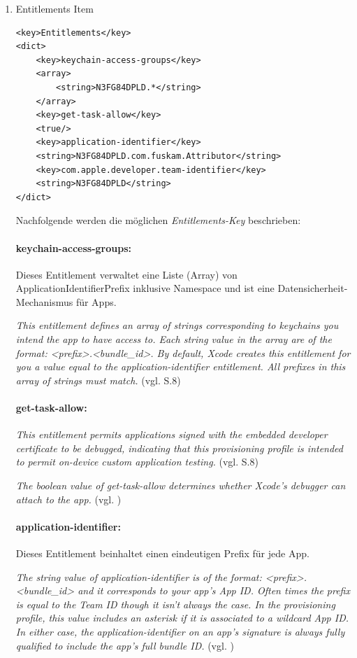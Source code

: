 \begin{enumerate}
    \item Entitlements Item
\begin{lstlisting}[captionpos=b, caption={Entitlements Item}]
<key>Entitlements</key>
<dict>
    <key>keychain-access-groups</key>
    <array>
        <string>N3FG84DPLD.*</string>           
    </array>
    <key>get-task-allow</key>
    <true/>
    <key>application-identifier</key>
    <string>N3FG84DPLD.com.fuskam.Attributor</string>
    <key>com.apple.developer.team-identifier</key>
    <string>N3FG84DPLD</string>
</dict>
\end{lstlisting}

Nachfolgende werden die möglichen \textit{\glqq Entitlements-Key\grqq{}} beschrieben:

\paragraph{keychain-access-groups:}
Dieses Entitlement verwaltet eine Liste (Array) von ApplicationIdentifierPrefix inklusive Namespace und ist eine Datensicherheit-Mechanismus für Apps. \par 
    \glqq \textit{This entitlement defines an array of strings corresponding to keychains you intend the app to have access to. Each string value in the array are of the format: <prefix>.<bundle\_id>. By default, Xcode creates this entitlement for you a value equal to the application-identifier entitlement. All prefixes in this array of strings must match.}\grqq{} (vgl. \cite{iOSSec[5]} S.8)

\paragraph{get-task-allow:} 
\glqq\textit{This entitlement permits applications signed with the embedded developer certificate to be debugged, indicating that this provisioning profile is intended to permit on-device custom application testing.}\grqq{} (vgl. \cite{iOSSec[5]} S.8) \par 
    \glqq \textit{The boolean value of get-task-allow determines whether Xcode's debugger can attach to the app.}\grqq{} (vgl. \cite{ProvisioningProfile[3]})

\paragraph{application-identifier:} Dieses Entitlement beinhaltet einen eindeutigen Prefix für jede App.\par
    \glqq \textit{The string value of application-identifier is of the format: <prefix>.<bundle\_id> and it corresponds to your app's App ID. Often times the prefix is equal to the Team ID though it isn't always the case. In the provisioning profile, this value includes an asterisk if it is associated to a wildcard App ID. In either case, the application-identifier on an app's signature is always fully qualified to include the app's full bundle ID.} \grqq{} (vgl. \cite{ProvisioningProfile[3]})


\end{enumerate}
